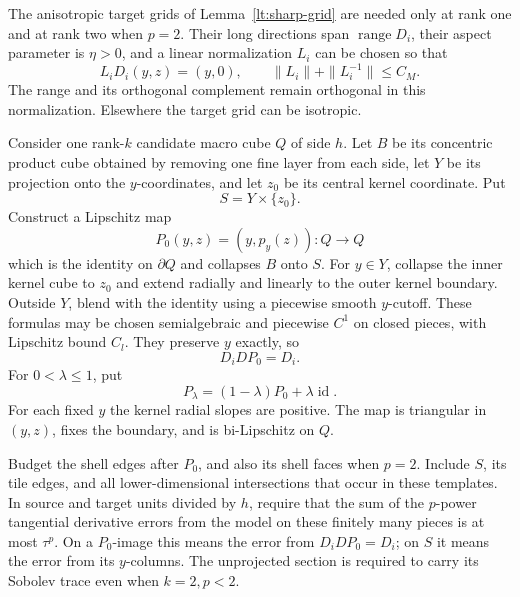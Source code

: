 \documentclass[11pt]{article}
\numberwithin{equation}{section}
\theoremstyle{definition}
\theoremstyle{remark}
\newcommand{\Id}{\operatorname{id}}
\begin{document}
The anisotropic target grids of Lemma~\ref{lt:sharp-grid} are needed
only at rank one and at rank two when $p=2$.  Their long directions
span $\operatorname{range}D_i$, their aspect parameter is $\eta>0$,
and a linear normalization $L_i$ can be chosen so that
\begin{equation}\label{la:normalization}
 L_iD_i(y,z)=(y,0),\qquad
 \|L_i\|+\|L_i^{-1}\|\le C_M.
\end{equation}
The range and its orthogonal complement remain orthogonal in this
normalization.  Elsewhere the target grid can be isotropic.

Consider one rank-$k$ candidate macro cube $Q$ of side $h$.  Let $B$
be its concentric product cube obtained by removing one fine layer
from each side, let $Y$ be its projection onto the $y$-coordinates,
and let $z_0$ be its central kernel coordinate.  Put
\[
 S=Y\times\{z_0\}.
\]
Construct a Lipschitz map
\begin{equation}\label{la:flat-collapse}
 P_0(y,z)=(y,p_y(z)):Q\longrightarrow Q
\end{equation}
which is the identity on $\partial Q$ and collapses $B$ onto $S$.
For $y\in Y$, collapse the inner kernel cube to $z_0$ and extend
radially and linearly to the outer kernel boundary.  Outside $Y$,
blend with the identity using a piecewise smooth $y$-cutoff.  These
formulas may be chosen semialgebraic and piecewise $C^1$ on closed
pieces, with Lipschitz bound $C_l$.  They preserve $y$ exactly, so
\begin{equation}\label{la:collapse-model-identity}
 D_iDP_0=D_i.
\end{equation}
For $0<\lambda\le1$, put
\begin{equation}\label{la:positive-collapse}
 P_\lambda=(1-\lambda)P_0+\lambda\Id.
\end{equation}
For each fixed $y$ the kernel radial slopes are positive.  The map is
triangular in $(y,z)$, fixes the boundary, and is bi-Lipschitz on $Q$.

Budget the shell edges after $P_0$, and also its shell faces when
$p=2$.  Include $S$, its tile edges, and all lower-dimensional
intersections that occur in these templates.  In source and target
units divided by $h$, require that the sum of the $p$-power
tangential derivative errors from the model on these finitely many
pieces is at most $\tau^p$.  On a $P_0$-image this means the error
from $D_iDP_0=D_i$; on $S$ it means the error from its $y$-columns.
The unprojected section is required to carry its Sobolev trace even
when $k=2,p<2$.
\end{document}
